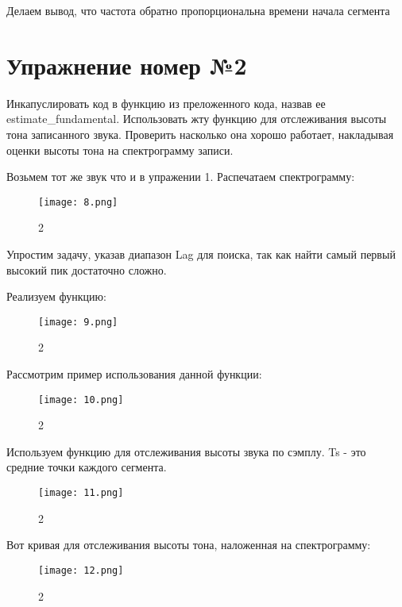 \documentclass[10pt,a4paper,oneside]{article}
\begin{document}
Делаем вывод, что частота обратно пропорциональна времени начала сегмента

\section{Упражнение номер №2}

Инкапуслировать код в функцию из преложенного кода, назвав ее estimate_fundamental. Использовать жту функцию для отслеживания высоты тона записанного звука. Проверить насколько она хорошо работает, накладывая оценки высоты тона на спектрограмму записи.

Возьмем тот же звук что и в упражении 1. Распечатаем спектрограмму: 

\begin{figure}[H]
        \centering
        \texttt{[image: 8.png]}
        \caption{2}
        \label{fig:first}
\end{figure}

Упростим задачу, указав диапазон Lag для поиска, так как найти самый первый высокий пик достаточно сложно.

Реализуем функцию: 

\begin{figure}[H]
        \centering
        \texttt{[image: 9.png]}
        \caption{2}
        \label{fig:first}
\end{figure}

Рассмотрим пример использования данной функции: 

\begin{figure}[H]
        \centering
        \texttt{[image: 10.png]}
        \caption{2}
        \label{fig:first}
\end{figure}

Используем функцию для отслеживания высоты звука по сэмплу. Ts - это средние точки каждого сегмента.

\begin{figure}[H]
        \centering
        \texttt{[image: 11.png]}
        \caption{2}
        \label{fig:first}
\end{figure}

Вот кривая для отслеживания высоты тона, наложенная на спектрограмму:

\begin{figure}[H]
        \centering
        \texttt{[image: 12.png]}
        \caption{2}
        \label{fig:first}
\end{figure}
\end{document}
